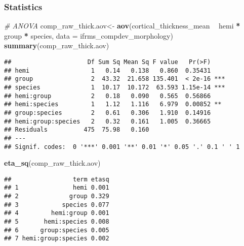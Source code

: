 \documentclass[
]{article}
\newenvironment{Shaded}{\begin{snugshade}}{\end{snugshade}}
\newcommand{\CommentTok}[1]{\textcolor[rgb]{0.56,0.35,0.01}{\textit{#1}}}
\newcommand{\DataTypeTok}[1]{\textcolor[rgb]{0.13,0.29,0.53}{#1}}
\newcommand{\KeywordTok}[1]{\textcolor[rgb]{0.13,0.29,0.53}{\textbf{#1}}}
\newcommand{\NormalTok}[1]{#1}
\newcommand{\OperatorTok}[1]{\textcolor[rgb]{0.81,0.36,0.00}{\textbf{#1}}}
\newcommand{\StringTok}[1]{\textcolor[rgb]{0.31,0.60,0.02}{#1}}
\begin{document}
\hypertarget{statistics-4}{%
\subsubsection{Statistics}\label{statistics-4}}

\begin{Shaded}
\begin{Highlighting}[]
\CommentTok{# ANOVA}
\NormalTok{comp_raw_thick.aov<-}\StringTok{ }\KeywordTok{aov}\NormalTok{(cortical_thickness_mean }\OperatorTok{~}\StringTok{ }\NormalTok{hemi }\OperatorTok{*}\StringTok{ }\NormalTok{group }\OperatorTok{*}\StringTok{ }\NormalTok{species, }
                          \DataTypeTok{data =}\NormalTok{ ifrms_compdev_morphology)}
\KeywordTok{summary}\NormalTok{(comp_raw_thick.aov)}
\end{Highlighting}
\end{Shaded}

\begin{verbatim}
##                     Df Sum Sq Mean Sq F value   Pr(>F)    
## hemi                 1   0.14   0.138   0.860  0.35431    
## group                2  43.32  21.658 135.401  < 2e-16 ***
## species              1  10.17  10.172  63.593 1.15e-14 ***
## hemi:group           2   0.18   0.090   0.565  0.56866    
## hemi:species         1   1.12   1.116   6.979  0.00852 ** 
## group:species        2   0.61   0.306   1.910  0.14916    
## hemi:group:species   2   0.32   0.161   1.005  0.36665    
## Residuals          475  75.98   0.160                     
## ---
## Signif. codes:  0 '***' 0.001 '**' 0.01 '*' 0.05 '.' 0.1 ' ' 1
\end{verbatim}

\begin{Shaded}
\begin{Highlighting}[]
\KeywordTok{eta_sq}\NormalTok{(comp_raw_thick.aov)}
\end{Highlighting}
\end{Shaded}

\begin{verbatim}
##                 term etasq
## 1               hemi 0.001
## 2              group 0.329
## 3            species 0.077
## 4         hemi:group 0.001
## 5       hemi:species 0.008
## 6      group:species 0.005
## 7 hemi:group:species 0.002
\end{verbatim}

\begin{Shaded}
\end{Shaded}
\end{document}

